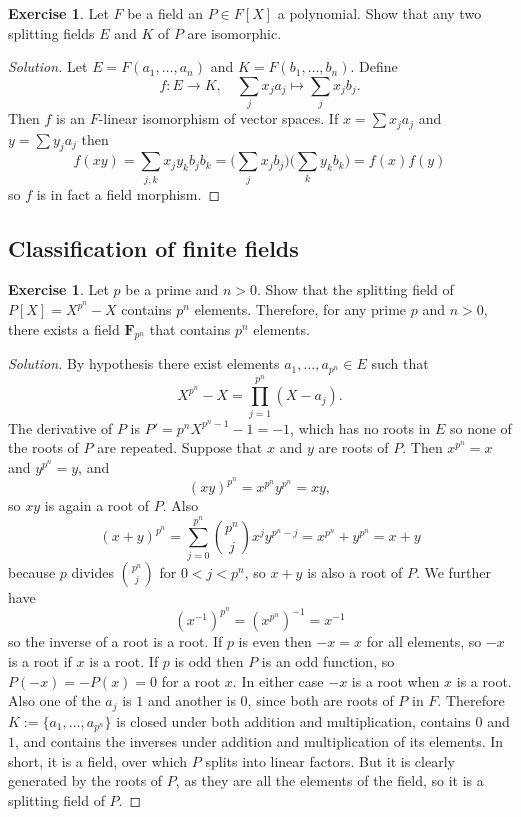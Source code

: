 \documentclass[11pt]{amsart}
\theoremstyle{definition}
\newtheorem{e}[theo]{Exercise}
\newenvironment{s}{\begin{proof}[Solution]}{\end{proof}}
\def\FF{\mathbf{F}}
\begin{document}
\begin{e}
Let $F$ be a field an $P \in F[X]$ a polynomial.
Show that any two splitting fields $E$ and $K$ of $P$ are isomorphic.
\end{e}

\begin{s}
Let $E = F(a_1, \ldots, a_n)$ and $K = F(b_1, \ldots, b_n)$.
Define
\[
f : E \longrightarrow K,
\quad
\sum_j x_j a_j \mapsto \sum_j x_j b_j.
\]
Then $f$ is an $F$-linear isomorphism of vector spaces.
If $x = \sum x_j a_j$ and $y = \sum y_j a_j$ then
\[
f(xy) = \sum_{j,k} x_j y_k b_j b_k
= \biggl(\sum_j x_j b_j \biggr)
\biggl( \sum_k y_k b_k \biggr)
= f(x) f(y)
\]
so $f$ is in fact a field morphism.
\end{s}



\subsection*{Classification of finite fields}

\begin{e}
\label{field_p_n}
Let $p$ be a prime and $n > 0$.
Show that the splitting field of $P[X] = X^{p^n} - X$ contains $p^n$ elements.
Therefore, for any prime $p$ and $n > 0$, there exists a field $\FF_{p^n}$ that contains $p^n$ elements.
\end{e}

\begin{s}
By hypothesis there exist elements $a_1, \ldots, a_{p^n} \in E$ such that
\[
X^{p^n} - X
= \prod_{j=1}^{p^n} (X - a_j).
\]
The derivative of $P$ is $P' = p^n X^{p^n-1} - 1 = -1$, which has no roots in $E$ so none of the roots of $P$ are repeated.
Suppose that $x$ and $y$ are roots of $P$.
Then $x^{p^n} = x$ and $y^{p^n} = y$, and
\[
(xy)^{p^n} = x^{p^n} y^{p^n} = xy,
\]
so $xy$ is again a root of $P$.
Also
\[
(x + y)^{p^n}
= \sum_{j=0}^{p^n} \binom{p^n}{j} x^{j} y^{p^n-j}
= x^{p^n} + y^{p^n}
= x + y
\]
because $p$ divides $\binom{p^n}{j}$ for $0 < j < p^n$, so $x+y$ is also a root of $P$.
We further have
\[
(x^{-1})^{p^n}
= (x^{p^n})^{-1}
= x^{-1}
\]
so the inverse of a root is a root.
If $p$ is even then $-x = x$ for all elements, so $-x$ is a root if $x$ is a root.
If $p$ is odd then $P$ is an odd function, so $P(-x) = -P(x) = 0$ for a root $x$.
In either case $-x$ is a root when $x$ is a root.
Also one of the $a_j$ is $1$ and another is $0$, since both are roots of $P$ in $F$.
Therefore $K := \{a_1, \ldots, a_{p^n}\}$ is closed under both addition and multiplication, contains $0$ and $1$, and contains the inverses under addition and multiplication of its elements.
In short, it is a field, over which $P$ splits into linear factors.
But it is clearly generated by the roots of $P$, as they are all the elements of the field, so it is a splitting field of $P$.
\end{s}
\end{document}
